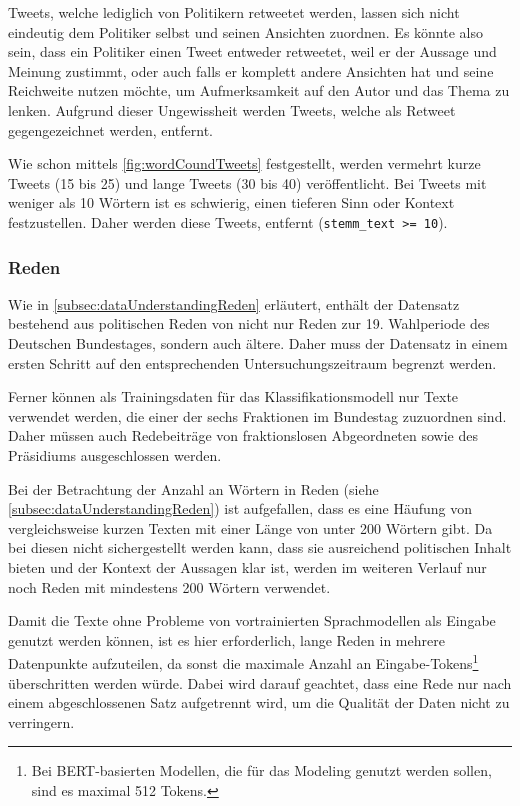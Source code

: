 Tweets, welche lediglich von Politikern retweetet werden, lassen sich nicht eindeutig dem Politiker selbst und seinen Ansichten zuordnen. Es könnte also sein, dass ein Politiker einen Tweet entweder retweetet, weil er der Aussage und Meinung zustimmt, oder auch falls er komplett andere Ansichten hat und seine Reichweite nutzen möchte, um Aufmerksamkeit auf den Autor und das Thema zu lenken. Aufgrund dieser Ungewissheit werden Tweets, welche als Retweet gegengezeichnet werden, entfernt.

Wie schon mittels \autoref{fig:wordCoundTweets} festgestellt, werden vermehrt kurze Tweets (\num{15} bis \num{25}) und lange Tweets (\num{30} bis \num{40}) veröffentlicht. Bei Tweets mit weniger als \num{10} Wörtern ist es schwierig, einen tieferen Sinn oder Kontext festzustellen. Daher werden diese Tweets, entfernt (\texttt{stemm\_text >= 10}).

\subsubsection*{Reden}

Wie in \autoref{subsec:dataUnderstandingReden} erläutert, enthält der Datensatz bestehend aus politischen Reden von \citeauthor{richter_open_2021} nicht nur Reden zur 19. Wahlperiode des Deutschen Bundestages, sondern auch ältere. Daher muss der Datensatz in einem ersten Schritt auf den entsprechenden Untersuchungszeitraum begrenzt werden.

Ferner können als Trainingsdaten für das Klassifikationsmodell nur Texte verwendet werden, die einer der sechs Fraktionen im Bundestag zuzuordnen sind. Daher müssen auch Redebeiträge von fraktionslosen Abgeordneten sowie des Präsidiums ausgeschlossen werden.

Bei der Betrachtung der Anzahl an Wörtern in Reden (siehe \autoref{subsec:dataUnderstandingReden}) ist aufgefallen, dass es eine Häufung von vergleichsweise kurzen Texten mit einer Länge von unter 200 Wörtern gibt. Da bei diesen nicht sichergestellt werden kann, dass sie ausreichend politischen Inhalt bieten und der Kontext der Aussagen klar ist, werden im weiteren Verlauf nur noch Reden mit mindestens 200 Wörtern verwendet.

Damit die Texte ohne Probleme von vortrainierten Sprachmodellen als Eingabe genutzt werden können, ist es hier erforderlich, lange Reden in mehrere Datenpunkte aufzuteilen, da sonst die maximale Anzahl an Eingabe-Tokens\footnote{Bei BERT-basierten Modellen, die für das Modeling genutzt werden sollen, sind es maximal 512 Tokens.} überschritten werden würde. Dabei wird darauf geachtet, dass eine Rede nur nach einem abgeschlossenen Satz aufgetrennt wird, um die Qualität der Daten nicht zu verringern.

